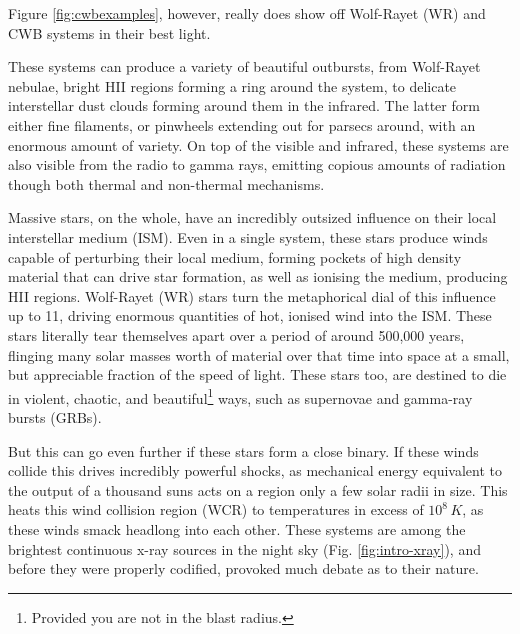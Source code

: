 Figure \ref{fig:cwbexamples}, however, really does show off Wolf-Rayet (WR) and CWB systems in their best light.

These systems can produce a variety of beautiful outbursts, from Wolf-Rayet nebulae, bright HII regions forming a ring around the system, to delicate interstellar dust clouds forming around them in the infrared.
The latter form either fine filaments, or pinwheels extending out for parsecs around, with an enormous amount of variety.
On top of the visible and infrared, these systems are also visible from the radio to gamma rays, emitting copious amounts of radiation though both thermal and non-thermal mechanisms.

Massive stars, on the whole, have an incredibly outsized influence on their local interstellar medium (ISM).
Even in a single system, these stars produce winds capable of perturbing their local medium, forming pockets of high density material that can drive star formation, as well as ionising the medium, producing HII regions.
Wolf-Rayet (WR) stars turn the metaphorical dial of this influence up to 11, driving enormous quantities of hot, ionised wind into the ISM.
These stars literally tear themselves apart over a period of around 500,000 years, flinging many solar masses worth of material over that time into space at a small, but appreciable fraction of the speed of light.
These stars too, are destined to die in violent, chaotic, and beautiful\footnote{Provided you are not in the blast radius.} ways, such as supernovae and gamma-ray bursts (GRBs).

But this can go even further if these stars form a close binary.
If these winds collide this drives incredibly powerful shocks, as mechanical energy equivalent to the output of a thousand suns acts on a region only a few solar radii in size.
This heats this wind collision region (WCR) to temperatures in excess of $10^8 \, \si{K}$, as these winds smack headlong into each other.
These systems are among the brightest continuous x-ray sources in the night sky (Fig. \ref{fig:intro-xray}), and before they were properly codified, provoked much debate as to their nature. 

